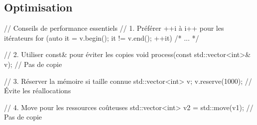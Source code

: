 \documentclass{article}
\begin{document}
\begin{multicols*}{4}
\section*{Optimisation}
\begin{cppcode}
// Conseils de performance essentiels
// 1. Préférer ++i à i++ pour les itérateurs
for (auto it = v.begin(); it != v.end(); ++it) { /* ... */ }

// 2. Utiliser const& pour éviter les copies
void process(const std::vector<int>& v); // Pas de copie

// 3. Réserver la mémoire si taille connue
std::vector<int> v; v.reserve(1000); // Évite les réallocations

// 4. Move pour les ressources coûteuses
std::vector<int> v2 = std::move(v1); // Pas de copie
\end{cppcode}









\end{multicols*}
\end{document}
